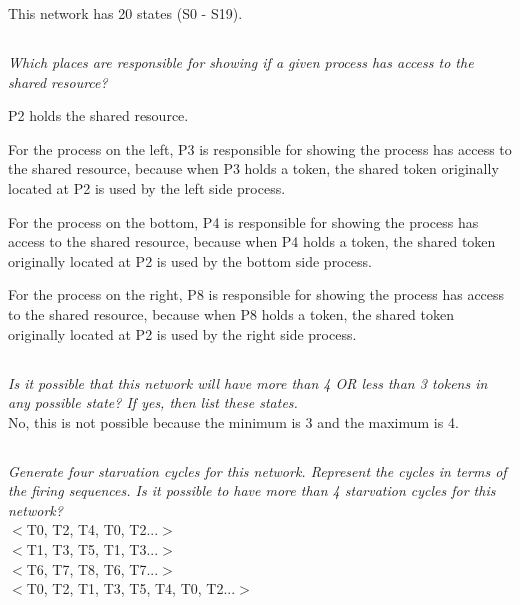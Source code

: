 \documentclass[letterpaper]{article}
\begin{document}
This network has 20 states (S0 - S19).

\subsection{}
\textit{Which places are responsible for showing if a given process has access to the shared resource?}

P2 holds the shared resource.

For the process on the left, P3 is responsible for showing the process has access
to the shared resource, because when P3 holds a token, the shared token originally
located at P2 is used by the left side process.

For the process on the bottom, P4 is responsible for showing the process has access
to the shared resource, because when P4 holds a token, the shared token originally
located at P2 is used by the bottom side process.

For the process on the right, P8 is responsible for showing the process has access
to the shared resource, because when P8 holds a token, the shared token originally
located at P2 is used by the right side process.

\subsection{}
\textit{Is it possible that this network will have more than 4 OR less than 3 tokens in any possible state?
 If yes, then list these states.
}\\

No, this is not possible because the minimum is 3 and the maximum is 4.

\subsection{}
\textit{Generate four starvation cycles for this network. Represent the cycles in terms of the firing sequences. Is it possible to have more than 4 starvation cycles for this network?}\\


$<$T0, T2, T4, T0, T2...$>$\\

$<$T1, T3, T5, T1, T3...$>$\\

$<$T6, T7, T8, T6, T7...$>$\\

$<$T0, T2, T1, T3, T5, T4, T0, T2...$>$\\
\end{document}
